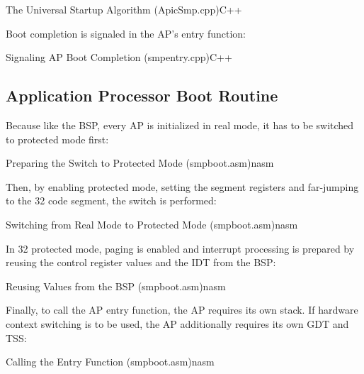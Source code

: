 \begin{codeblock}{The Universal Startup Algorithm (ApicSmp.cpp)}{C++}
\end{codeblock}

Boot completion is signaled in the AP's entry function:

\begin{codeblock}{Signaling AP Boot Completion (smp\textunderscore{}entry.cpp)}{C++}
\end{codeblock}

\subsection{Application Processor Boot Routine}
\label{subsec:apxapboot}

Because like the BSP, every AP is initialized in real mode, it has to be switched to protected mode first:

\begin{codeblock}{Preparing the Switch to Protected Mode (smp\textunderscore{}boot.asm)}{nasm}
\end{codeblock}

Then, by enabling protected mode, setting the segment registers and far-jumping to the \SI{32}{\bit} code segment, the switch is performed:

\begin{codeblock}{Switching from Real Mode to Protected Mode (smp\textunderscore{}boot.asm)}{nasm}
\end{codeblock}

In \SI{32}{\bit} protected mode, paging is enabled and interrupt processing is prepared by reusing the control register values and the IDT from the BSP\@:

\begin{codeblock}{Reusing Values from the BSP (smp\textunderscore{}boot.asm)}{nasm}
\end{codeblock}

Finally, to call the AP entry function, the AP requires its own stack. If hardware context switching is to be used, the AP additionally requires its own GDT and TSS\@:

\begin{codeblock}{Calling the Entry Function (smp\textunderscore{}boot.asm)}{nasm}
\end{codeblock}

